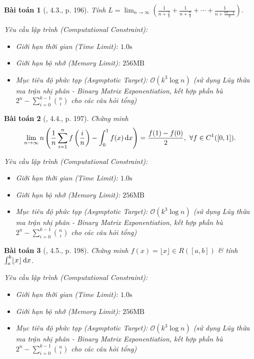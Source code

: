 \documentclass{article}
\newtheorem{baitoan}{Bài toán}
\begin{document}
\begin{baitoan}[\cite{Quoc_Long_Dat_Nam_VMC}, 4.3., p. 196]
	Tính $L = \lim_{n\to\infty} \left(\frac{1}{n + \frac{2}{3}} + \frac{1}{n + \frac{8}{3}} + \cdots + \frac{1}{n + \frac{6n - 4}{3}}\right)$.

    \vspace{0.5em}
    \emph{Yêu cầu lập trình (Computational Constraint):}
    \begin{itemize}
        \item Giới hạn thời gian (Time Limit): $1.0\mathrm{s}$
        \item Giới hạn bộ nhớ (Memory Limit): $256\mathrm{MB}$
        \item Mục tiêu độ phức tạp (Asymptotic Target): $\mathcal{O}(k^3 \log n)$ (sử dụng Lũy thừa ma trận nhị phân - Binary Matrix Exponentiation, kết hợp phần bù $2^n - \sum_{i=0}^{k-1} \binom{n}{i}$ cho các câu hỏi tổng)
    \end{itemize}
\end{baitoan}


\begin{baitoan}[\cite{Quoc_Long_Dat_Nam_VMC}, 4.4., p. 197]
	Chứng minh
	\begin{equation*}
		\lim_{n\to\infty} n\left(\frac{1}{n}\sum_{i=1}^n f\left(\frac{i}{n}\right) - \int_0^1 f(x)\,{\rm d}x\right) = \frac{f(1) - f(0)}{2},\ \forall f\in C^1([0,1]).
	\end{equation*}

    \vspace{0.5em}
    \emph{Yêu cầu lập trình (Computational Constraint):}
    \begin{itemize}
        \item Giới hạn thời gian (Time Limit): $1.0\mathrm{s}$
        \item Giới hạn bộ nhớ (Memory Limit): $256\mathrm{MB}$
        \item Mục tiêu độ phức tạp (Asymptotic Target): $\mathcal{O}(k^3 \log n)$ (sử dụng Lũy thừa ma trận nhị phân - Binary Matrix Exponentiation, kết hợp phần bù $2^n - \sum_{i=0}^{k-1} \binom{n}{i}$ cho các câu hỏi tổng)
    \end{itemize}
\end{baitoan}


\begin{baitoan}[\cite{Quoc_Long_Dat_Nam_VMC}, 4.5., p. 198]
	Chứng minh $f(x) = \lfloor x\rfloor\in R([a,b])$ \& tính $\int_a^b \lfloor x\rfloor\,{\rm d}x$.

    \vspace{0.5em}
    \emph{Yêu cầu lập trình (Computational Constraint):}
    \begin{itemize}
        \item Giới hạn thời gian (Time Limit): $1.0\mathrm{s}$
        \item Giới hạn bộ nhớ (Memory Limit): $256\mathrm{MB}$
        \item Mục tiêu độ phức tạp (Asymptotic Target): $\mathcal{O}(k^3 \log n)$ (sử dụng Lũy thừa ma trận nhị phân - Binary Matrix Exponentiation, kết hợp phần bù $2^n - \sum_{i=0}^{k-1} \binom{n}{i}$ cho các câu hỏi tổng)
    \end{itemize}
\end{baitoan}
\end{document}
